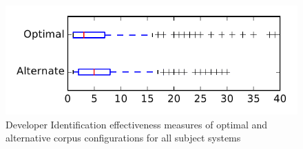
\begin{figure}
\centering
\includegraphics[height=0.4\textheight]{figures/combo/dit_rq2_tiny}
\caption{Developer Identification effectiveness measures of optimal and alternative corpus configurations for all subject systems}
\label{fig:combo:dit:rq2:tiny}
\end{figure}
